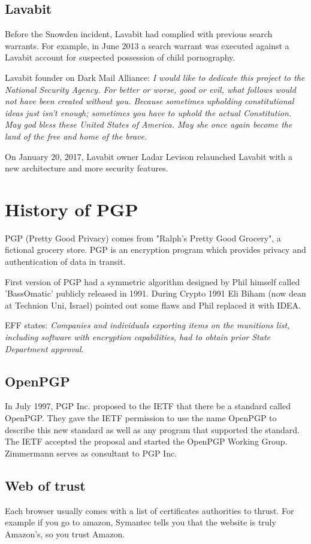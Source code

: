 \documentclass{llncs}
\begin{document}
\subsection{Lavabit}
Before the Snowden incident, Lavabit had complied with previous search warrants. For example, in June 2013 a search warrant was executed against a Lavabit account for suspected possession of child pornography.

Lavabit founder on Dark Mail Alliance: \textit{I would like to dedicate this project to the National Security Agency. For better or worse, good or evil, what follows would not have been created without you. Because sometimes upholding constitutional  ideas just isn't enough; sometimes you have to uphold the actual Constitution. May god bless these  United States of America. May she once again become the land of the free and home of the brave.}

On January 20, 2017, Lavabit owner Ladar Levison relaunched Lavabit with a new architecture and more security features.

\section{History of PGP}

PGP (Pretty Good Privacy) comes from "Ralph's Pretty Good Grocery", a fictional grocery store. PGP is an encryption program which provides privacy and authentication of data in transit.

First version of PGP had a symmetric algorithm designed by Phil himself called 'BassOmatic' publicly released in 1991. During Crypto 1991 Eli Biham (now dean at Technion Uni, Israel) pointed out some flaws and Phil replaced it with IDEA.

EFF states:
\textit{Companies and individuals exporting items on the munitions list, including software with encryption capabilities, had to obtain prior State Department approval.}

\subsection{OpenPGP}
In July 1997, PGP Inc. proposed to the IETF that there be a standard called OpenPGP. They gave the IETF permission to use the name OpenPGP to describe this new standard as well as any program that supported the standard. The IETF accepted the proposal and started the OpenPGP Working Group. Zimmermann serves as consultant to PGP Inc.


\subsection{Web of trust}
Each browser usually comes with a list of certificates authorities to thrust. For example if you go to amazon, Symantec tells you that the website is truly Amazon's, so you trust Amazon.
\end{document}
